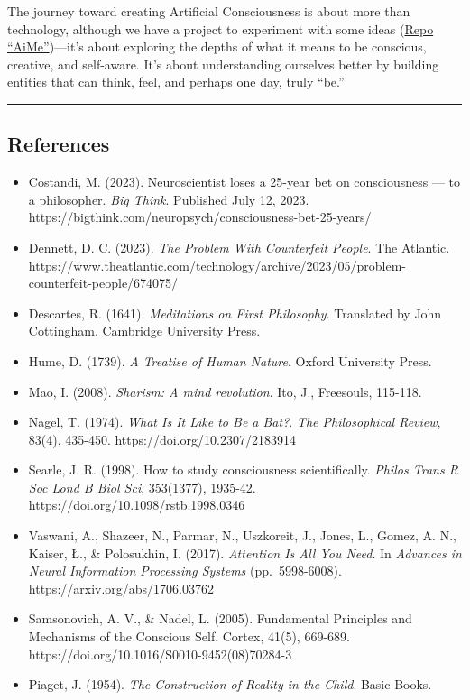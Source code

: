 \documentclass[
]{article}
\providecommand{\tightlist}{%
  \setlength{\itemsep}{0pt}\setlength{\parskip}{0pt}}
\begin{document}
The journey toward creating Artificial Consciousness is about more than
technology, although we have a project to experiment with some ideas
(\href{https://github.com/immartian/aime}{Repo ``AiMe''})---it's about
exploring the depths of what it means to be conscious, creative, and
self-aware. It's about understanding ourselves better by building
entities that can think, feel, and perhaps one day, truly ``be.''

\begin{center}\rule{0.5\linewidth}{0.5pt}\end{center}

\hypertarget{references}{%
\subsection{References}\label{references}}

\begin{itemize}
\tightlist
\item
  Costandi, M. (2023). Neuroscientist loses a 25-year bet on
  consciousness --- to a philosopher. \emph{Big Think}. Published July
  12, 2023. https://bigthink.com/neuropsych/consciousness-bet-25-years/
\item
  Dennett, D. C. (2023). \emph{The Problem With Counterfeit People}. The
  Atlantic.
  https://www.theatlantic.com/technology/archive/2023/05/problem-counterfeit-people/674075/
\item
  Descartes, R. (1641). \emph{Meditations on First Philosophy}.
  Translated by John Cottingham. Cambridge University Press.
\item
  Hume, D. (1739). \emph{A Treatise of Human Nature}. Oxford University
  Press.
\item
  Mao, I. (2008). \emph{Sharism: A mind revolution}. Ito, J., Freesouls,
  115-118.
\item
  Nagel, T. (1974). \emph{What Is It Like to Be a Bat?}. \emph{The
  Philosophical Review}, 83(4), 435-450. https://doi.org/10.2307/2183914
\item
  Searle, J. R. (1998). How to study consciousness scientifically.
  \emph{Philos Trans R Soc Lond B Biol Sci}, 353(1377), 1935-42.
  https://doi.org/10.1098/rstb.1998.0346
\item
  Vaswani, A., Shazeer, N., Parmar, N., Uszkoreit, J., Jones, L., Gomez,
  A. N., Kaiser, Ł., \& Polosukhin, I. (2017). \emph{Attention Is All
  You Need}. In \emph{Advances in Neural Information Processing Systems}
  (pp.~5998-6008). https://arxiv.org/abs/1706.03762
\item
  Samsonovich, A. V., \& Nadel, L. (2005). Fundamental Principles and
  Mechanisms of the Conscious Self. Cortex, 41(5), 669-689.
  https://doi.org/10.1016/S0010-9452(08)70284-3
\item
  Piaget, J. (1954). \emph{The Construction of Reality in the Child}.
  Basic Books.
\end{itemize}
\end{document}
